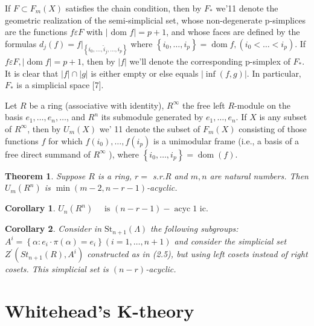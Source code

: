 \documentclass{book}
\newtheorem{theo}{Theorem}
\newtheorem{coro}{Corollary}
\begin{document}
If $F \subset F_m(X)$ satisfies the chain condition, then by $F_*$ we'11 denote the geometric realization of the semi-simplicial set, whose non-degenerate p-simplices are the functions $f \varepsilon F$ with $\mid$ dom $f \mid=p+1$, and whose faces are defined by the formulas $d_j(f)=\left.f\right|_{\left\{i_0, \ldots, \hat{i}_j, \ldots, i_p\right\}}$ where $\left\{i_0, \ldots, i_p\right\}=\operatorname{dom} f,\left(i_0<\ldots<i_p\right)$. If $f \varepsilon F,|\operatorname{dom} f|=p+1$, then by $|f|$ we'll denote the corresponding p-simplex of $F_*$. It is clear that $|f| \cap|g|$ is either empty or else equals $|\inf (f, g)|$. In particular, $F_*$ is a simplicial space [7].

Let $R$ be a ring (associative with identity), $R^{\infty}$ the free left $R$-module on the basis $e_1, \ldots, e_n, \ldots$, and $R^n$ its submodule generated by $e_1, \ldots, e_n$. If $X$ is any subset of $R^{\infty}$, then by $U_m(X)$ we' 11 denote the subset of $F_m(X)$ consisting of those functions $f$ for which $f\left(i_0\right), \ldots, f\left(i_p\right)$ is a unimodular frame (i.e., a basis of a free direct summand of $R^{\infty}$ ), where $\left\{i_0, \ldots, i_p\right\}=\operatorname{dom}(f)$.

\begin{theo}
Suppose $R$ is a ring, $r=$ s.r.R and $m, n$ are natural numbers. Then $U_m\left(R^n\right)$ is $\min (m-2, n-r-1)$-acyclic.
\end{theo}


\begin{coro}
    $U_n\left(R^n\right) \quad \text { is }(n-r-1)-\operatorname{acyc} 1 \text { ic. }$
\end{coro}

\begin{coro}
Consider in $\mathrm{St}_{n+1}(\Lambda)$ the following subgroups: $A^i=\left\{\alpha: e_i \cdot \pi(\alpha)=e_i\right\}(i=1, \ldots, n+1)$ and consider the simplicial set $Z^{\prime}\left(S t_{n+1}(R), A^i\right)$ constructed as in (2.5), but using left cosets instead of right cosets. This simplicial set is $(n-r)$-acyclic.  
\end{coro}














\section{Whitehead's K-theory}
\end{document}
